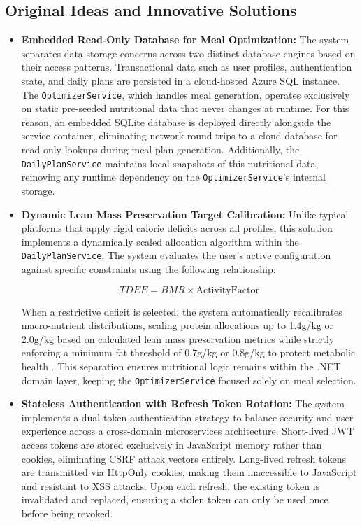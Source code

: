 \subsection{Original Ideas and Innovative Solutions}
\begin{itemize}
    \item \textbf{Embedded Read-Only Database for Meal Optimization:} The system separates data 
    storage concerns across two distinct database engines based on their access patterns. 
    Transactional data such as user profiles, authentication state, and daily plans are persisted 
    in a cloud-hosted Azure SQL instance. The \texttt{OptimizerService}, which handles meal 
    generation, operates exclusively on static pre-seeded nutritional data that never changes at 
    runtime. For this reason, an embedded SQLite database is deployed directly alongside the service 
    container, eliminating network round-trips to a cloud database for read-only lookups during meal 
    plan generation. Additionally, the \texttt{DailyPlanService} maintains local snapshots of this 
    nutritional data, removing any runtime dependency on the \texttt{OptimizerService}'s internal storage.

    \item \textbf{Dynamic Lean Mass Preservation Target Calibration:} Unlike typical platforms that 
    apply rigid calorie deficits across all profiles, this solution implements a dynamically scaled 
    allocation algorithm within the \texttt{DailyPlanService}. The system evaluates the user's 
    active configuration against specific constraints using the following relationship:
    
    \begin{equation}
        TDEE = BMR \times \text{ActivityFactor}
    \end{equation}
    
    When a restrictive deficit is selected, the system automatically recalibrates macro-nutrient 
    distributions, scaling protein allocations up to 1.4g/kg or 2.0g/kg based on calculated lean
    mass preservation metrics \cite{art:jager:issn:protein:2017} while strictly enforcing a minimum 
    fat threshold of 0.7g/kg or 0.8g/kg to protect metabolic health \cite{techreport:fao:energy}. 
    This separation ensures nutritional logic remains within the .NET domain layer, keeping 
    the \texttt{OptimizerService} focused solely on meal selection.

    \item \textbf{Stateless Authentication with Refresh Token Rotation:} The system implements a
    dual-token authentication strategy to balance security and user experience across a 
    cross-domain microservices architecture. Short-lived JWT access tokens are stored 
    exclusively in JavaScript memory rather than cookies, eliminating CSRF attack vectors 
    entirely. Long-lived refresh tokens are transmitted via HttpOnly cookies, making them 
    inaccessible to JavaScript and resistant to XSS attacks. Upon each refresh, the existing 
    token is invalidated and replaced, ensuring a stolen token can only be used once before 
    being revoked.
\end{itemize}

